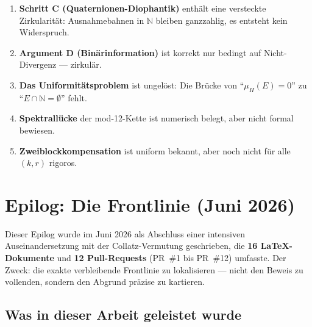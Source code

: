 \documentclass[12pt,a4paper]{article}
\newcommand{\N}{\mathbb{N}}
\begin{document}
\begin{tcolorbox}[warnung, title={Ehrliche Bilanz der Grenzen}]
\begin{enumerate}[label=(\arabic*), nosep, itemsep=3pt]
  \item \textbf{Schritt C (Quaternionen-Diophantik)} enthält eine
    versteckte Zirkularität: Ausnahmebahnen in $\N$ bleiben ganzzahlig,
    es entsteht kein Widerspruch.
  \item \textbf{Argument D (Binärinformation)} ist korrekt nur bedingt
    auf Nicht-Divergenz --- zirkulär.
  \item \textbf{Das Uniformitätsproblem} ist ungelöst: Die Brücke von
    ``$\mu_H(E) = 0$'' zu ``$E \cap \N = \emptyset$'' fehlt.
  \item \textbf{Spektrallücke} der mod-12-Kette ist numerisch belegt,
    aber nicht formal bewiesen.
  \item \textbf{Zweiblockkompensation} ist uniform bekannt, aber noch
    nicht für alle $(k,r)$ rigoros.
\end{enumerate}
\end{tcolorbox}


\section*{Epilog: Die Frontlinie (Juni 2026)}
\label{sec:epilog}

\begin{tcolorbox}[epilog]
Dieser Epilog wurde im Juni 2026 als Abschluss einer intensiven
Auseinandersetzung mit der Collatz-Vermutung geschrieben, die
\textbf{16 LaTeX-Dokumente} und \textbf{12 Pull-Requests} (PR~\#1
bis PR~\#12) umfasste. Der Zweck: die exakte verbleibende Frontlinie
zu lokalisieren --- nicht den Beweis zu vollenden, sondern den Abgrund
präzise zu kartieren.
\end{tcolorbox}

\subsection*{Was in dieser Arbeit geleistet wurde}
\end{document}
